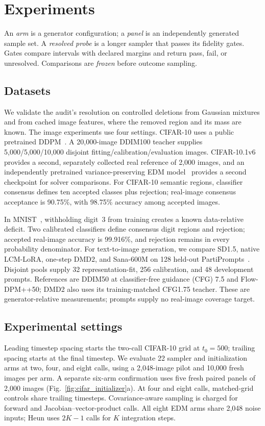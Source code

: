\section{Experiments}
\label{sec:experiments}
An \emph{arm} is a generator configuration; a \emph{panel} is an
independently generated sample set. A \emph{resolved probe} is a longer
sampler that passes its fidelity gates. Gates compare intervals with
declared margins and return pass, fail, or unresolved. Comparisons are
\emph{frozen} before outcome sampling.

\subsection{Datasets}
\label{sec:datasets}
We validate the audit's resolution on controlled deletions from Gaussian
mixtures and from cached image features, where the removed region and
its mass are known. The image experiments use four settings.
CIFAR-10 uses a public pretrained DDPM~\cite{krizhevsky2009cifar,ho2020ddpm}.
A 20,000-image DDIM100 teacher supplies 5,000/5,000/10,000 disjoint
fitting/calibration/evaluation images. CIFAR-10.1v6~\cite{recht2018cifar10}
provides a second, separately collected real reference of 2,000 images,
and an independently pretrained variance-preserving EDM
model~\cite{karras2022edm} provides a second checkpoint for solver
comparisons. For CIFAR-10 semantic regions, classifier consensus defines ten
accepted classes plus rejection; real-image consensus acceptance is
90.75\%, with 98.75\% accuracy among accepted images.

In MNIST~\cite{lecun1998mnist}, withholding digit~3 from training creates
a known data-relative deficit. Two calibrated classifiers define consensus
digit regions and rejection; accepted real-image accuracy is 99.916\%, and
rejection remains in every probability denominator. For text-to-image
generation, we compare SD1.5, native LCM-LoRA, one-step DMD2, and Sana-600M
\cite{rombach2022ldm,luo2023lcmlora,yin2024dmd2,xie2025sana} on 128 held-out
PartiPrompts~\cite{yu2022parti}. Disjoint pools supply 32 representation-fit,
256 calibration, and 48 development prompts. References are DDIM50 at
classifier-free guidance (CFG) 7.5 and Flow-DPM++50; DMD2 also uses its
training-matched CFG1.75 teacher. These are generator-relative
measurements; prompts supply no real-image coverage target.

\subsection{Experimental settings}
\label{sec:settings}
Leading timestep spacing starts the two-call CIFAR-10 grid at $t_0=500$;
trailing spacing starts at the final timestep. We evaluate 22 sampler
and initialization arms at two, four, and eight calls, using a
2,048-image pilot and 10,000 fresh images per arm. A separate six-arm
confirmation uses five fresh paired panels of 2,000 images
(Fig.~\ref{fig:cifar_initializer}a). At four and eight calls, matched-grid
controls share trailing timesteps. Covariance-aware sampling is charged
for forward and Jacobian--vector-product calls. All eight EDM arms share
2,048 noise inputs; Heun uses $2K-1$ calls for $K$ integration steps.

